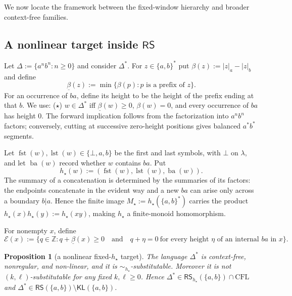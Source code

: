 \documentclass[11pt,a4paper]{article}
\newtheorem{proposition}[theorem]{Proposition}
\theoremstyle{remark}
\theoremstyle{plain}
\begin{document}
We now locate the framework between the fixed-window hierarchy and broader
context-free families.

\subsection{A nonlinear target inside \texorpdfstring{$\mathsf{RS}$}{RS}}

Let $\Delta:=\{a^nb^n:n\ge0\}$ and consider $\Delta^*$.  For
$z\in\{a,b\}^*$ put $\beta(z):=|z|_a-|z|_b$ and define
\[
 \underline\beta(z):=
 \min\{\beta(p):p\text{ is a prefix of }z\}.
\]  For an occurrence of
$ba$, define its height to be the height of the prefix ending at that $b$.
We use:
\textup{($\star$)} $w\in\Delta^*$ iff
$\underline\beta(w)\ge0$, $\beta(w)=0$, and every occurrence of $ba$
has height $0$.  The forward implication follows from the factorization into
$a^nb^n$ factors; conversely, cutting at successive zero-height positions
gives balanced $a^*b^*$ segments.

Let $\operatorname{fst}(w),\operatorname{lst}(w)\in\{\bot,a,b\}$ be
the first and last symbols, with $\bot$ on $\lambda$, and let
$\operatorname{ba}(w)$ record whether $w$ contains $ba$.  Put
\[
h_\star(w):=
(\operatorname{fst}(w),\operatorname{lst}(w),\operatorname{ba}(w)).
\]
The summary of a concatenation is determined by the summaries of its factors:
the endpoints concatenate in the evident way and a new $ba$ can arise only
across a boundary $b|a$.  Hence the finite image
$M_\star:=h_\star(\{a,b\}^*)$ carries the product
$h_\star(x)h_\star(y):=h_\star(xy)$, making $h_\star$ a finite-monoid
homomorphism.

For nonempty $x$, define
\[
 \mathcal E(x):=
 \{q\in\mathbb Z:
 q+\underline\beta(x)\ge0\quad\text{and}\quad
 q+\eta=0\ \text{for every height $\eta$ of an internal $ba$ in $x$}\}.
\]

\begin{proposition}[a nonlinear fixed-$h_\star$ target]
\label{prop:nonlinear-rs-example}
The language $\Delta^*$ is context-free, nonregular, and non-linear, and it is
$\sim_{h_\star}$-substitutable.  Moreover it is not
$(k,\ell)$-substitutable for any fixed $k,\ell\ge0$.  Hence
$\Delta^*\in\mathsf{RS}_{h_\star}(\{a,b\})\cap\mathrm{CFL}$ and
$\Delta^*\in\mathsf{RS}(\{a,b\})\setminus\mathsf{KL}(\{a,b\})$.
\end{proposition}
\end{document}

